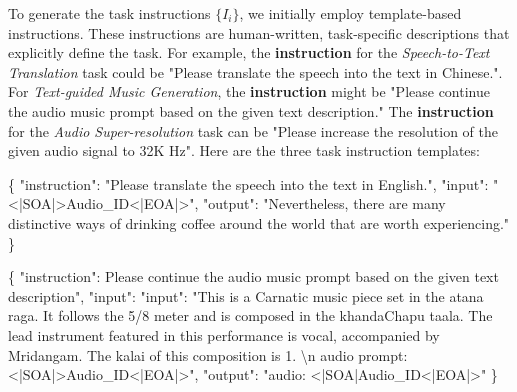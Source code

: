 To generate the task instructions \( \{I_{i}\} \), we initially employ template-based instructions. These instructions are human-written, task-specific descriptions that explicitly define the task. For example, the \textbf{instruction} for the \textit{Speech-to-Text Translation} task could be "Please translate the speech into the text in Chinese.". For \textit{Text-guided Music Generation}, the \textbf{instruction} might be "Please continue the audio music prompt based on the given text description." The \textbf{instruction} for the \textit{Audio Super-resolution} task can be "Please increase the resolution of the given audio signal to 32K Hz". Here are the three task instruction templates:
\begin{tcolorbox}[colback=white, colframe=black, boxrule=0.2mm, arc=0mm, title=Speech-to-Text Translation]
\{
"instruction": "Please translate the speech into the text in English.", 
"input": "<|SOA|>Audio\_ID<|EOA|>", 
"output": "Nevertheless, there are many distinctive ways of drinking coffee around the world that are worth experiencing."
\}
\end{tcolorbox}


\begin{tcolorbox}[colback=white, colframe=black, boxrule=0.2mm, arc=0mm, title=Text-guided Music Continuation]
\{
"instruction": Please continue the audio music prompt based on the given text description",
"input": "input": "This is a Carnatic music piece set in the atana raga. It follows the 5/8 meter and is composed in the khandaChapu taala. The lead instrument featured in this performance is vocal, accompanied by Mridangam. The kalai of this composition is 1. \textbackslash n audio prompt: <|SOA|>Audio\_ID<|EOA|>",
"output": "audio: <|SOA|Audio\_ID<|EOA|>"
\}
\end{tcolorbox}


